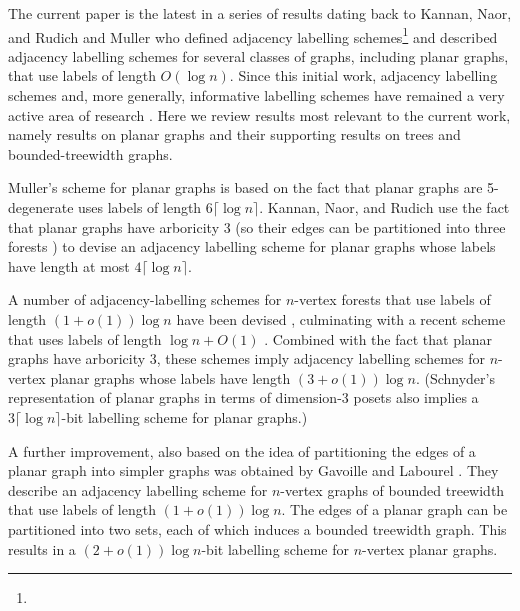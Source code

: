 \documentclass[kpfonts]{patmorin}
\begin{document}
The current paper is the latest in a series of results dating back to Kannan, Naor, and Rudich \cite{kannan.naor.ea:implicit0,kannan.naor.ea:implicit} and Muller \cite{muller:local} who defined adjacency labelling schemes\footnote{} and described adjacency labelling schemes for several classes of graphs, including planar graphs, that use labels of length $O(\log n)$.  Since this initial work, adjacency labelling schemes and, more generally, informative labelling schemes have remained a very active area of research \cite{alstrup.kaplan.ea:adjacency,abrahamsen.alstrup.ea:near-optimal,alstrup.dahlgaard.ea:sublinear,alstrup.gortz.ea:distance,alstrup.gavoille.ea:simpler,alstrup.rauhe:improved,X,X,X,X,X}. Here we review results most relevant to the current work, namely results on planar graphs and their supporting results on trees and bounded-treewidth graphs.

Muller's scheme for planar graphs \cite{muller:local} is based on the fact that planar graphs are 5-degenerate uses labels of length $6\lceil\log n\rceil$.  Kannan, Naor, and Rudich \cite{kannan.naor.ea:implicit} use the fact that planar graphs have arboricity 3 (so their edges can be partitioned into three forests \cite{nash-williams:edge-disjoint}) to devise an adjacency labelling scheme for planar graphs whose labels have length at most $4\lceil\log n\rceil$.  

A number of adjacency-labelling schemes for $n$-vertex forests that use labels of length $(1+o(1))\log n$ have been devised \cite{chung:universal, alstrup.rauhe:improved,alstrup.dahlgaard.ea:optimal}, culminating with a recent scheme that uses labels of length $\log n + O(1)$ \cite{alstrup.dahlgaard.ea:optimal}.  Combined with the fact that planar graphs have arboricity 3, these schemes imply adjacency labelling schemes for $n$-vertex planar graphs whose labels have length $(3+o(1))\log n$.   (Schnyder's representation of planar graphs in terms of dimension-3 posets \cite{schnyder:planar} also implies a $3\lceil\log n\rceil$-bit labelling scheme for planar graphs.)

A further improvement, also based on the idea of partitioning the edges of a planar graph into simpler graphs was obtained by Gavoille and Labourel \cite{gavoille.labourel:shorter}.  They describe an adjacency labelling scheme for $n$-vertex graphs of bounded treewidth that use labels of length $(1+o(1))\log n$.  The edges of a planar graph can be partitioned into two sets, each of which induces a bounded treewidth graph.  This results in a $(2+o(1))\log n$-bit labelling scheme for $n$-vertex planar graphs.
\end{document}
